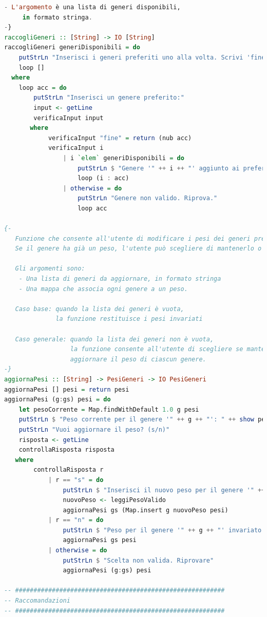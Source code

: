 \documentclass[a4paper,11pt]{article}
\begin{document}
\begin{lstlisting}[language=Haskell]
   - L'argomento è una lista di generi disponibili,
     in formato stringa.
-}
raccogliGeneri :: [String] -> IO [String]
raccogliGeneri generiDisponibili = do
    putStrLn "Inserisci i generi preferiti uno alla volta. Scrivi 'fine' per terminare."
    loop []
  where
    loop acc = do
        putStrLn "Inserisci un genere preferito:"
        input <- getLine
        verificaInput input
       where
            verificaInput "fine" = return (nub acc)
            verificaInput i
                | i `elem` generiDisponibili = do
                    putStrLn $ "Genere '" ++ i ++ "' aggiunto ai preferiti."
                    loop (i : acc)
                | otherwise = do
                    putStrLn "Genere non valido. Riprova."
                    loop acc

{-
   Funzione che consente all'utente di modificare i pesi dei generi preferiti.
   Se il genere ha già un peso, l'utente può scegliere di mantenerlo o aggiornarlo.

   Gli argomenti sono:
    - Una lista di generi da aggiornare, in formato stringa
    - Una mappa che associa ogni genere a un peso.

   Caso base: quando la lista dei generi è vuota,
              la funzione restituisce i pesi invariati

   Caso generale: quando la lista dei generi non è vuota,
                  la funzione consente all'utente di scegliere se mantenere o
                  aggiornare il peso di ciascun genere.
-}
aggiornaPesi :: [String] -> PesiGeneri -> IO PesiGeneri
aggiornaPesi [] pesi = return pesi
aggiornaPesi (g:gs) pesi = do
    let pesoCorrente = Map.findWithDefault 1.0 g pesi
    putStrLn $ "Peso corrente per il genere '" ++ g ++ "': " ++ show pesoCorrente
    putStrLn "Vuoi aggiornare il peso? (s/n)"
    risposta <- getLine
    controllaRisposta risposta
   where
        controllaRisposta r
            | r == "s" = do
                putStrLn $ "Inserisci il nuovo peso per il genere '" ++ g ++ "':"
                nuovoPeso <- leggiPesoValido
                aggiornaPesi gs (Map.insert g nuovoPeso pesi)
            | r == "n" = do
                putStrLn $ "Peso per il genere '" ++ g ++ "' invariato."
                aggiornaPesi gs pesi
            | otherwise = do
                putStrLn $ "Scelta non valida. Riprovare"
                aggiornaPesi (g:gs) pesi

-- #########################################################
-- Raccomandazioni
-- #########################################################


\end{lstlisting}
\end{document}
